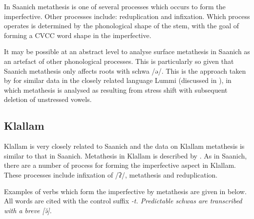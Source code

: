 In Saanich metathesis is one of several
processes which occurs to form the imperfective.
Other processes include: reduplication and infixation.
Which process operates is determined by the phonological shape of the stem,
with the goal of forming a CVCC word shape in the imperfective.

It may be possible at an abstract level to analyse surface metathesis in Saanich
as an artefact of other phonological processes.
This is particularly so given that Saanich metathesis only affects roots with schwa /ə/.
This is the approach taken by \cite{de74} for similar data in the
closely related language Lummi (discussed in ),
in which metathesis is analysed as resulting from
stress shift with subsequent deletion of unstressed vowels.

\subsection{Klallam}\label{sec:Kla}
Klallam is very closely related to Saanich
and the data on Klallam metathesis is similar to that in Saanich.
Metathesis in Klallam is described by \cite{thth69}.
As in Saanich, there are a number of process for forming the imperfective aspect in Klallam.
These processes include infixation of /ʔ/, metathesis and reduplication.

Examples of verbs which form the imperfective by metathesis
are given in  below.
All words are cited with the control suffix \it{-t}.
Predictable schwas are transcribed with a breve [ə̆].

